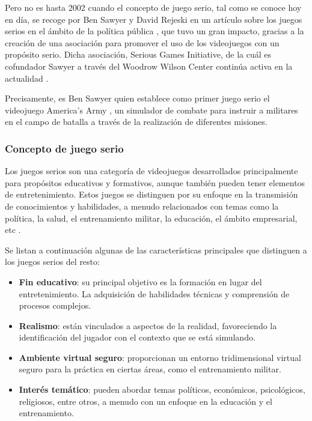 Pero no es hasta 2002 cuando el concepto de juego serio, tal como se conoce hoy en día, se recoge por Ben Sawyer
y David Rejeski en un artículo sobre los juegos serios en el ámbito de la política pública \parencite{juegosSerios6}, que tuvo un gran impacto, gracias a la creación de una asociación para promover el uso de los videojuegos con un propósito serio. Dicha asociación, Serious Games Initiative, de la cuál es cofundador Sawyer a través del Woodrow Wilson Center continúa activa en la actualidad \parencite{juegosSerios4}.

Precisamente, es Ben Sawyer quien establece como primer juego serio el videojuego America’s Army \parencite{juegosSerios7}, un simulador de combate para instruir a militares en el campo de batalla a través de la realización de diferentes misiones.


\subsubsection{Concepto de juego serio}
Los juegos serios son una categoría de videojuegos desarrollados principalmente para propósitos educativos y formativos, aunque también pueden tener elementos de entretenimiento. Estos juegos se distinguen por su enfoque en la transmisión de conocimientos y habilidades, a menudo relacionados con temas como la política, la salud, el entrenamiento militar, la educación, el ámbito empresarial, etc  \parencite{juegosSerios3}.

Se listan a continuación algunas de las características principales que distinguen a los juegos serios del resto:

\begin{itemize}[leftmargin=1.5cm, topsep=0pt, itemsep=1pt, after=\vspace{0pt}]
    \item \textbf{Fin educativo}: su principal objetivo es la formación en lugar del entretenimiento. La adquisición de habilidades técnicas y comprensión de procesos complejos.
    \item \textbf{Realismo}: están vinculados a aspectos de la realidad, favoreciendo la identificación del jugador con el contexto que se está simulando.
    \item \textbf{Ambiente virtual seguro}: proporcionan un entorno tridimensional virtual seguro para la práctica en ciertas áreas, como el entrenamiento militar.
    \item \textbf{Interés temático}: pueden abordar temas políticos, económicos, psicológicos, religiosos, entre otros, a menudo con un enfoque en la educación y el entrenamiento.
\end{itemize}

